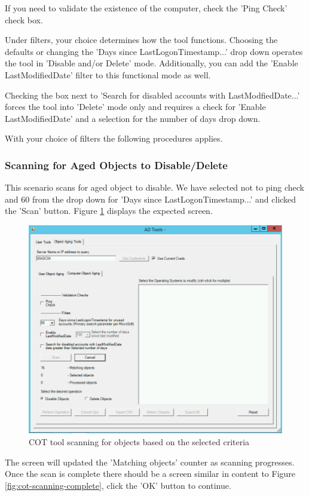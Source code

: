 \documentclass[12pt,a4paper,titlepage]{article}
\begin{document}
	If you need to validate the existence of the computer, check the 'Ping Check' check box.
	
	Under filters, your choice determines how the tool functions. Choosing the defaults or changing the 'Days since LastLogonTimestamp...' drop down operates the tool in 'Disable and/or Delete' mode. Additionally, you can add the 'Enable LastModifiedDate' filter to this functional mode as well.
	
	Checking the box next to 'Search for disabled accounts with LastModfiedDate...' forces the tool into 'Delete' mode only and requires a check for 'Enable LastModifiedDate' and a selection for the number of days drop down.
	
	With your choice of filters the following procedures applies.
	
	\subsubsection{Scanning for Aged Objects to Disable/Delete}
	This scenario scans for aged object to disable. We have selected not to ping check and 60 from the drop down for 'Days since LastLogonTimestamp...' and clicked the 'Scan' button. Figure \ref{fig:cot-scanning} displays the expected screen.
	\begin{figure}[h!]
		\centering
		\includegraphics[width=0.9\linewidth]{images/COT-scanning}
		\caption{COT tool scanning for objects based on the selected criteria}
		\label{fig:cot-scanning}
	\end{figure}
	
	The screen will updated the 'Matching objects' counter as scanning progresses. Once the scan is complete there should be a screen similar in content to Figure \ref{fig:cot-scanning-complete}, click the 'OK' button to continue.
	
\end{document}
